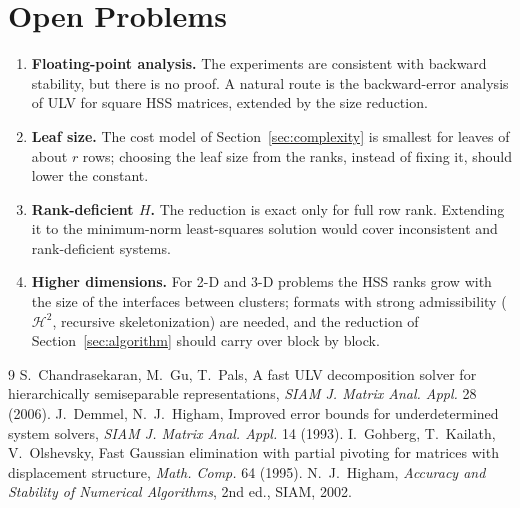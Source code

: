 \documentclass[11pt]{article}
\theoremstyle{plain}
\begin{document}
\section{Open Problems}\label{sec:open}
\begin{enumerate}[leftmargin=1.5em,itemsep=2pt]
\item \textbf{Floating-point analysis.} The experiments are consistent with backward stability, but there
is no proof. A natural route is the backward-error analysis of ULV for square HSS matrices, extended by the
size reduction.
\item \textbf{Leaf size.} The cost model of Section~\ref{sec:complexity} is smallest for leaves of about $r$
rows; choosing the leaf size from the ranks, instead of fixing it, should lower the constant.
\item \textbf{Rank-deficient $H$.} The reduction is exact only for full row rank. Extending it to the
minimum-norm least-squares solution would cover inconsistent and rank-deficient systems.
\item \textbf{Higher dimensions.} For 2-D and 3-D problems the HSS ranks grow with the size of the
interfaces between clusters; formats with strong admissibility ($\mathcal H^2$, recursive
skeletonization) are needed, and the reduction of Section~\ref{sec:algorithm} should carry over block by
block.
\end{enumerate}

\begin{thebibliography}{9}\small
{} S.~Chandrasekaran, M.~Gu, T.~Pals, A fast ULV decomposition solver for hierarchically
semiseparable representations, \emph{SIAM J. Matrix Anal. Appl.} 28 (2006).
 J.~Demmel, N.~J.~Higham, Improved error bounds for underdetermined system solvers,
\emph{SIAM J. Matrix Anal. Appl.} 14 (1993).
 I.~Gohberg, T.~Kailath, V.~Olshevsky, Fast Gaussian elimination with partial pivoting
for matrices with displacement structure, \emph{Math. Comp.} 64 (1995).
 N.~J.~Higham, \emph{Accuracy and Stability of Numerical Algorithms}, 2nd ed., SIAM,
2002.
\end{thebibliography}
\end{document}
